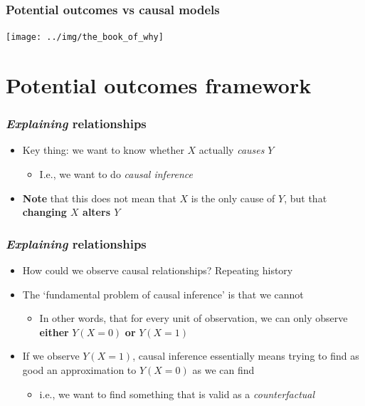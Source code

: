 \documentclass[aspectratio=43]{beamer}
\begin{document}
\begin{frame}
\frametitle{Potential outcomes vs causal models}
\centering

\texttt{[image: ../img/the\_book\_of\_why]}

\end{frame}

\section{Potential outcomes framework}


\begin{frame}
\frametitle{\textit{Explaining} relationships}
\centering

\begin{itemize}
  \item Key thing: we want to know whether $X$ actually \textit{causes} $Y$
  \begin{itemize}
    \item I.e., we want to do \textit{causal inference}
  \end{itemize}
  \item \textbf{Note} that this does not mean that $X$ is the only cause of $Y$, but that \textbf{changing $X$ alters $Y$}
\end{itemize}

\end{frame}

\begin{frame}
\frametitle{\textit{Explaining} relationships}
\centering

\begin{itemize}
  \item How could we observe causal relationships? Repeating history
  \item<2-> The `fundamental problem of causal inference' is that we cannot
  \begin{itemize}
    \item In other words, that for every unit of observation, we can only observe \textbf{either} $Y(X=0)$ \textbf{or} $Y(X=1)$
  \end{itemize}
  \item<3-> If we observe $Y(X=1)$, causal inference essentially means trying to find as good an approximation to $Y(X=0)$ as we can find
  \begin{itemize}
    \item i.e., we want to find something that is valid as a \textit{counterfactual}
  \end{itemize}
\end{itemize}

\end{frame}
\end{document}

